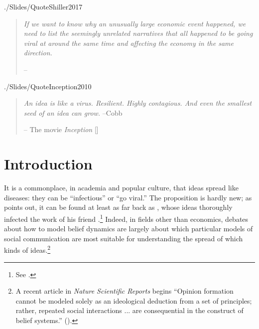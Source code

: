   \begin{verbatimwrite}{./Slides/QuoteShiller2017}
    \begin{quote}
      \textit{If we want to know why an unusually large economic event happened, we need to list the seemingly unrelated narratives that all happened to be going viral at around the same time and affecting the economy in the same direction.}

      \medskip
      \indent -- \href{https://www.amazon.com/dp/B07VZWLRM8/ref=cm_sw_em_r_mt_dp_BT5KE0VTHQX6DJ35FD9C}{\cite{shiller2017narrative}}
    \end{quote}
  \end{verbatimwrite}
  

  \begin{verbatimwrite}{./Slides/QuoteInception2010}
    \begin{quote}
      \textit{An idea is like a virus. Resilient. Highly contagious. And even the smallest seed of an idea can grow.}   --Cobb

      \medskip \indent --
      The movie \textit{Inception} [\citeyear{Inception2010}]
    \end{quote}
  \end{verbatimwrite}
  

  \ifInBook{
  \end{frontmatter}%
}{}

\section{Introduction}
\label{chap1:sec1}

It is a commonplace, in academia and popular culture, that ideas spread like diseases: they can be ``infectious'' or ``go viral.''  The proposition is hardly new; as \cite{shiller2017narrative} points out, it can be found at least as far back as \cite{humeenquiry}, whose ideas thoroughly infected the work of his friend \cite{smithwealth}.\footnote{See \cite{rasmussen2017infidel}.} Indeed, in fields other than economics, debates about how to model belief dynamics are largely about which particular models of social communication are most suitable for understanding the spread of which kinds of ideas.\footnote{A recent article in \textit{Nature Scientific Reports} begins ``Opinion formation cannot be modeled solely as an ideological deduction from a set of principles; rather, repeated social interactions ... are consequential in the construct of belief systems.'' (\cite{nedic2019graph}).}

